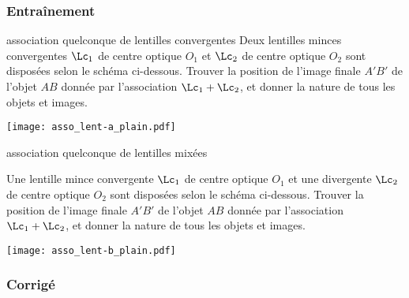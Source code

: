 \documentclass[../main/main.tex]{subfiles}
\begin{document}
\subsubsection{Entraînement}

\begin{exem}[label=exem:asso_lent]{association quelconque de lentilles
    convergentes}
    Deux lentilles minces convergentes $\Lc_1$ de centre optique $O_1$ et
    $\Lc_2$ de centre optique $O_2$ sont disposées selon le schéma ci-dessous.
    Trouver la position de l'image finale $A'B'$ de l'objet $AB$ donnée par
    l'association $\Lc_1 + \Lc_2$, et donner la nature de tous les objets et
    images.
    \tcblower
    \begin{center}
        \texttt{[image: asso\_lent-a\_plain.pdf]}
        \label{fig:asso_lent-conv_plain}
    \end{center}
\end{exem}
\begin{exem}[label=exem:asso_lent]{association quelconque de lentilles
    mixées}

    Une lentille mince convergente $\Lc_1$ de centre optique $O_1$ et une
    divergente $\Lc_2$ de centre optique $O_2$ sont disposées selon le schéma
    ci-dessous. Trouver la position de l'image finale $A'B'$ de l'objet $AB$
    donnée par l'association $\Lc_1 + \Lc_2$, et donner la nature de tous les
    objets et images.

    \tcblower
    \begin{center}
        \texttt{[image: asso\_lent-b\_plain.pdf]}
        \label{fig:asso_lent-mix_plain}
    \end{center}
\end{exem}

\subsubsection{Corrigé}
\end{document}
